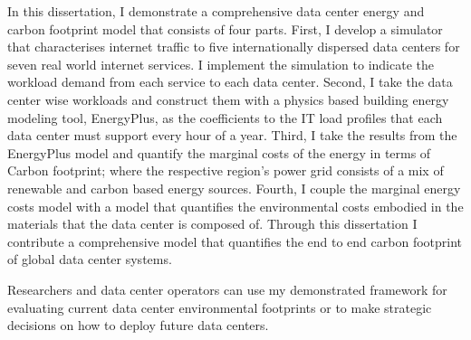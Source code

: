In this dissertation, I demonstrate a comprehensive data center energy and carbon footprint model that consists of four parts. First, I develop a simulator that characterises internet traffic to five internationally dispersed data centers for seven real world internet services. I implement the simulation to indicate the workload demand from each service to each data center. Second, I take the data center wise workloads and construct them with a physics based building energy modeling tool, EnergyPlus, as the coefficients to the IT load profiles that each data center must support every hour of a year. Third, I take the results from the EnergyPlus model and quantify the marginal costs of the energy in terms of Carbon footprint; where the respective region’s power grid consists of a mix of renewable and carbon based energy sources. Fourth, I couple the marginal energy costs model with a model that quantifies the environmental costs embodied in the materials that the data center is composed of. Through this dissertation I contribute a comprehensive model that quantifies the end to end carbon footprint of global data center systems. 

Researchers and data center operators can use my demonstrated framework for evaluating current data center environmental footprints or to make strategic decisions on how to deploy future data centers. 
